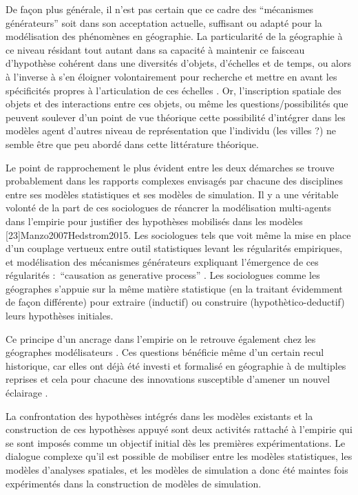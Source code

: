 De façon plus générale, il n'est pas certain que ce cadre des \enquote{mécanismes générateurs} soit dans son acceptation actuelle, suffisant ou adapté pour la modélisation des phénomènes en géographie. La particularité de la géographie à ce niveau résidant tout autant dans sa capacité à maintenir ce faisceau d'hypothèse cohérent dans une diversités d'objets, d'échelles et de temps, ou alors à l'inverse à s'en éloigner volontairement pour recherche et mettre en avant les spécificités propres à l'articulation de ces échelles \autocite{Sanders2001}. Or, l'inscription spatiale des objets et des interactions entre ces objets, ou même les questions/possibilités que peuvent soulever d'un point de vue théorique cette possibilité d'intégrer dans les modèles agent d'autres niveau de représentation que l'individu (les villes \autocite{Sanders2006} ?) ne semble être que peu abordé dans cette littérature théorique.
 
Le point de rapprochement le plus évident entre les deux démarches se trouve probablement dans les rapports complexes envisagés par chacune des disciplines entre ses modèles statistiques et ses modèles de simulation. Il y a une véritable volonté de la part de ces sociologues de réancrer  la modélisation multi-agents dans l'empirie pour justifier des hypothèses mobilisés dans les modèles \autocite{Manzo2005}[23]{Manzo2007}{Hedstrom2015}. Les sociologues tels que \textcite{Goldortorpe1999} voit même la mise en place d'un couplage vertueux entre outil statistiques levant les régularités empiriques, et modélisation des mécanismes générateurs expliquant l'émergence de ces régularités : \foreignquote{english}{causation as generative process} \autocite[50]{Manzo2005}. Les sociologues comme les géographes s'appuie sur la même matière statistique (en la traitant évidemment de façon différente) pour extraire (inductif) ou construire (hypothètico-deductif) leurs hypothèses initiales. 

Ce principe d'un ancrage dans l'empirie on le retrouve également chez les géographes modélisateurs \autocite{Banos2013}. Ces questions bénéficie même d'un certain recul historique, car elles ont déjà été investi et formalisé en géographie à de multiples reprises et cela pour chacune des innovations susceptible d'amener un nouvel éclairage \autocite{Sanders2000, Mathian2014}.

La confrontation des hypothèses intégrés dans les modèles existants \autocite{Pumain1983, Sanders1984} et la construction de ces hypothèses appuyé  \autocite{AMORAL1983} sont deux activités rattaché à l'empirie qui se sont imposés comme un objectif initial dès les premières expérimentations. Le dialogue complexe qu'il est possible de mobiliser entre les modèles statistiques, les modèles d'analyses spatiales, et les modèles de simulation a donc été maintes fois expérimentés dans la construction de modèles de simulation.





